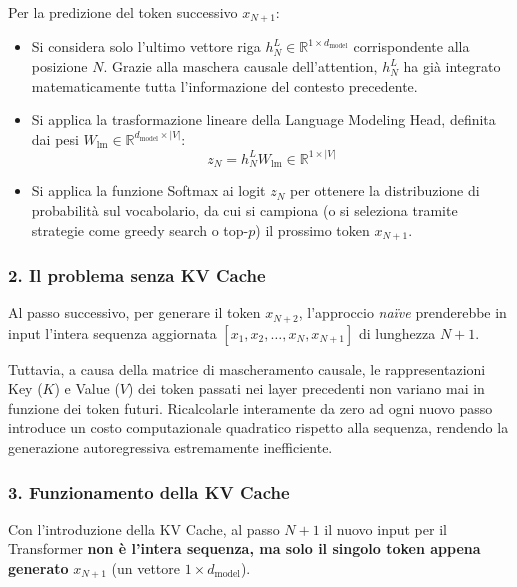 Per la predizione del token successivo $x_{N+1}$:
\begin{itemize}
    \item Si considera solo l'ultimo vettore riga $h_N^L \in \mathbb{R}^{1 \times d_{\text{model}}}$ corrispondente alla posizione $N$. Grazie alla maschera causale dell'attention, $h_N^L$ ha già integrato matematicamente tutta l'informazione del contesto precedente.
    \item Si applica la trasformazione lineare della Language Modeling Head, definita dai pesi $W_{\text{lm}} \in \mathbb{R}^{d_{\text{model}} \times |V|}$:
    \begin{equation}
        z_N = h_N^L W_{\text{lm}} \in \mathbb{R}^{1 \times |V|}
    \end{equation}
    \item Si applica la funzione Softmax ai logit $z_N$ per ottenere la distribuzione di probabilità sul vocabolario, da cui si campiona (o si seleziona tramite strategie come greedy search o top-$p$) il prossimo token $x_{N+1}$.
\end{itemize}

\subsubsection*{2. Il problema senza KV Cache}
Al passo successivo, per generare il token $x_{N+2}$, l'approccio \textit{naïve} prenderebbe in input l'intera sequenza aggiornata $[x_1, x_2, \dots, x_N, x_{N+1}]$ di lunghezza $N+1$. 

Tuttavia, a causa della matrice di mascheramento causale, le rappresentazioni Key ($K$) e Value ($V$) dei token passati nei layer precedenti non variano mai in funzione dei token futuri. Ricalcolarle interamente da zero ad ogni nuovo passo introduce un costo computazionale quadratico rispetto alla sequenza, rendendo la generazione autoregressiva estremamente inefficiente.

\subsubsection*{3. Funzionamento della KV Cache}
Con l'introduzione della KV Cache, al passo $N+1$ il nuovo input per il Transformer \textbf{non è l'intera sequenza, ma solo il singolo token appena generato} $x_{N+1}$ (un vettore $1 \times d_{\text{model}}$).

